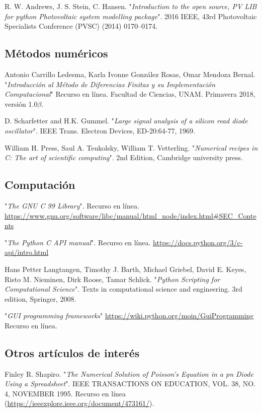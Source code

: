 \begin{thebibliography}{9999999}
	R. W. Andrews, J. S. Stein, C. Hansen.
	"\textit{Introduction to the open source, PV LIB for python Photovoltaic system modelling package}".
	2016 IEEE, 43rd Photovoltaic Specialists Conference (PVSC) (2014) 0170–0174.


\subsection*{\hspace{-4.2em} Métodos numéricos}

	Antonio Carrillo Ledesma, Karla Ivonne González Rosas, Omar Mendoza Bernal.
	"\textit{Introducción al Método de Diferencias Finitas y su Implementación Computacional}"
	Recurso en línea.
	Facultad de Ciencias, UNAM.
	Primavera 2018, versión 1.0$\beta$.

	D. Scharfetter and H.K. Gummel.
	"\textit{Large signal analysis of a silicon read diode oscillator}".
	IEEE Trans. Electron Devices, ED-20:64-77, 1969.

	William H. Press, Saul A. Teukolsky, William T. Vetterling.
	"\textit{Numerical recipes in C: The art of scientific computing}".
	2nd Edition, Cambridge university press.

\subsection*{\hspace{-4.2em} Computación}

	"\textit{The GNU C 99 Library}".
	Recurso en línea.
	\url{https://www.gnu.org/software/libc/manual/html_node/index.html#SEC_Contents}

	"\textit{The Python C API manual}".
	Recurso en línea.
	\url{https://docs.python.org/3/c-api/intro.html}

	Hans Petter Langtangen, Timothy J. Barth, Michael Griebel, David E. Keyes, Risto M. Nieminen, Dirk Roose, Tamar Schlick.
	"\textit{Python Scripting for Computational Science}".
	Texts in computational science and engineering.
	3rd edition, Springer, 2008.

	"\textit{GUI programming frameworks}"
	\url{https://wiki.python.org/moin/GuiProgramming}
	Recurso en línea.

\subsection*{\hspace{-4.2em} Otros artículos de interés}

	Finley R. Shapiro.
	"\textit{The Numerical Solution of Poisson’s Equation in a pn Diode Using a Spreadsheet}".
	IEEE TRANSACTIONS ON EDUCATION, VOL. 38, NO. 4, NOVEMBER 1995.
	Recurso en línea (\url{https://ieeexplore.ieee.org/document/473161/}).
	





\end{thebibliography}



